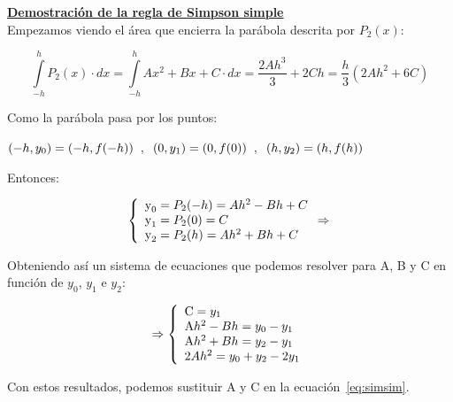 \documentclass{article}
\begin{document}
			\underline{\textbf{Demostración de la regla de Simpson simple}} \\
			
			Empezamos viendo el área que encierra la parábola descrita por $P_2(x)$:
			
			\begin{equation}\label{eq:simsim}
				\int \limits_{-h}^{h} P_2(x) \cdot dx = 
				\int \limits_{-h}^{h} Ax^2+Bx+C \cdot dx =
				\frac{2Ah^3}{3}+2Ch = \frac{h}{3}(2Ah^2+6C)
			\end{equation}
			
			Como la parábola pasa por los puntos:
			
			\begin{center}
				$(-h,y_0)=(-h,f(-h)) \hspace{2mm},\hspace{2mm}
				(0,y_1)=(0,f(0)) \hspace{2mm},\hspace{2mm}
				(h,y_2)=(h,f(h))$
			\end{center}
			
			Entonces:
			
			\begin{equation*}
				\left\lbrace
				\begin{array}{ll}
					\textup y_0 = P_2(-h) = Ah^2-Bh+C\\
					\textup y_1 = P_2(0) = C\\
					\textup y_2 = P_2(h) = Ah^2+Bh+C\\
				\end{array}
				\Rightarrow\right.
			\end{equation*}
			
			Obteniendo así un sistema de ecuaciones que podemos resolver para A, B y C en función de $y_0$, $y_1$ e $y_2$:
			
			\begin{equation}
				\Rightarrow
				\left\lbrace
				\begin{array}{ll}
					\textup C = y_1\\
					\textup Ah^2-Bh = y_0 - y_1\\
					\textup Ah^2+Bh = y_2 - y_1\\
					\textup 2Ah^2 = y_0 + y_2 - 2y_1\\
				\end{array}
				\right.
			\end{equation}
			
			Con estos resultados, podemos sustituir A y C en la ecuación~\ref{eq:simsim}.
			
\end{document}
